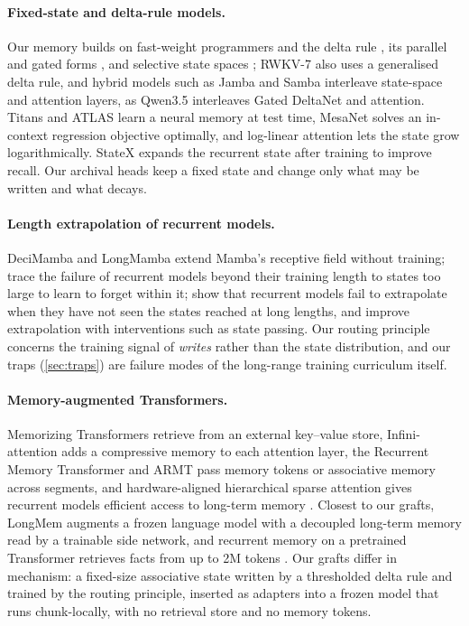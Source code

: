 \documentclass[11pt]{article}
\begin{document}
\paragraph{Fixed-state and delta-rule models.} Our memory builds on fast-weight programmers and the delta rule \citep{widrowhoff1960,schmidhuber1992,schlag2021}, its parallel and gated forms \citep{deltanet2024,gdn2024,gla2023}, and selective state spaces \citep{mamba2023,mamba2_2024,mamba3_2025}; RWKV-7 \citep{rwkv7_2025} also uses a generalised delta rule, and hybrid models such as Jamba and Samba \citep{jamba2024,samba2024} interleave state-space and attention layers, as Qwen3.5 interleaves Gated DeltaNet and attention. Titans and ATLAS \citep{titans2024,atlas2025} learn a neural memory at test time, MesaNet \citep{mesanet2025} solves an in-context regression objective optimally, and log-linear attention \citep{loglinear2025} lets the state grow logarithmically. StateX \citep{statex2025} expands the recurrent state after training to improve recall. Our archival heads keep a fixed state and change only what may be written and what decays.

\paragraph{Length extrapolation of recurrent models.} DeciMamba \citep{decimamba2024} and LongMamba \citep{longmamba2025} extend Mamba's receptive field without training; \citet{stuffedmamba2024} trace the failure of recurrent models beyond their training length to states too large to learn to forget within it; \citet{buitrago2025} show that recurrent models fail to extrapolate when they have not seen the states reached at long lengths, and improve extrapolation with interventions such as state passing. Our routing principle concerns the training signal of \emph{writes} rather than the state distribution, and our traps (\cref{sec:traps}) are failure modes of the long-range training curriculum itself.

\paragraph{Memory-augmented Transformers.} Memorizing Transformers \citep{memorizingtf2022} retrieve from an external key--value store, Infini-attention \citep{infiniattention2024} adds a compressive memory to each attention layer, the Recurrent Memory Transformer \citep{rmt2022} and ARMT \citep{armt2024} pass memory tokens or associative memory across segments, and hardware-aligned hierarchical sparse attention gives recurrent models efficient access to long-term memory \citep{hsa_ramba2025}. Closest to our grafts, LongMem \citep{longmem2023} augments a frozen language model with a decoupled long-term memory read by a trainable side network, and recurrent memory on a pretrained Transformer retrieves facts from up to 2M tokens \citep{rmtscaling2024}. Our grafts differ in mechanism: a fixed-size associative state written by a thresholded delta rule and trained by the routing principle, inserted as adapters \citep{adapters2019,lora2021} into a frozen model that runs chunk-locally, with no retrieval store and no memory tokens.
\end{document}
